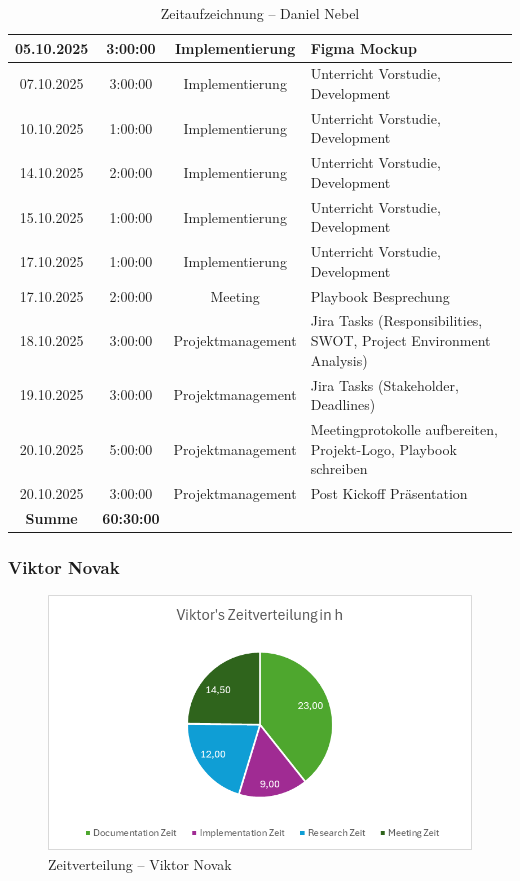 \documentclass{article}
\begin{document}
\begin{table}[H]
\begin{tabularx}{\textwidth}{|c|c|c|X|}
    05.10.2025 & 3:00:00 & Implementierung   & Figma Mockup \\ \hline
    07.10.2025 & 3:00:00 & Implementierung   & Unterricht Vorstudie, Development \\ \hline
    10.10.2025 & 1:00:00 & Implementierung   & Unterricht Vorstudie, Development \\ \hline
    14.10.2025 & 2:00:00 & Implementierung   & Unterricht Vorstudie, Development \\ \hline
    15.10.2025 & 1:00:00 & Implementierung   & Unterricht Vorstudie, Development \\ \hline
    17.10.2025 & 1:00:00 & Implementierung   & Unterricht Vorstudie, Development \\ \hline
    17.10.2025 & 2:00:00 & Meeting           & Playbook Besprechung \\ \hline
    18.10.2025 & 3:00:00 & Projektmanagement & Jira Tasks (Responsibilities, SWOT, Project Environment Analysis) \\ \hline
    19.10.2025 & 3:00:00 & Projektmanagement & Jira Tasks (Stakeholder, Deadlines) \\ \hline
    20.10.2025 & 5:00:00 & Projektmanagement & Meetingprotokolle aufbereiten, Projekt-Logo, Playbook schreiben \\ \hline
    20.10.2025 & 3:00:00 & Projektmanagement & Post Kickoff Präsentation \\ \hline
    \rowcolor{black!10}\textbf{Summe} & \textbf{60:30:00} & & \\ \hline
  \end{tabularx}
  \caption{Zeitaufzeichnung – Daniel Nebel}
  \label{tab:zeit-daniel}
\end{table}


\subsubsection*{Viktor Novak}

\begin{figure}[H]
  \centering
  \includegraphics[width=\textwidth]{Viktor_Zeitverteilung.png}
  \caption{Zeitverteilung – Viktor Novak}
  \label{fig:viktor-zeitverteilung}
\end{figure}
\end{document}
